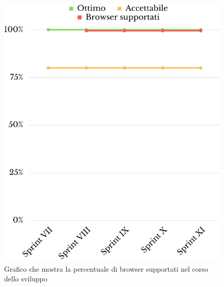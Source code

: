 \begin{figure}[H]
	\centering
	\includegraphics[scale=0.35]{img/browser.png}
	\caption{Grafico che mostra la percentuale di browser supportati nel corso dello sviluppo}
\end{figure}
